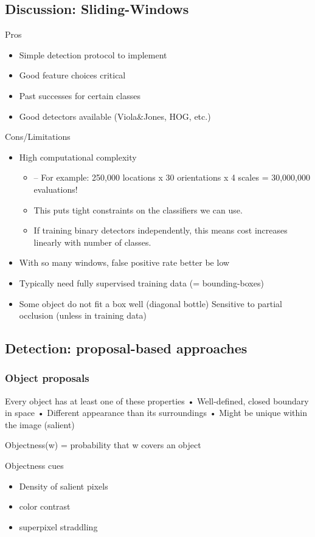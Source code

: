 \subsection{Discussion: Sliding-Windows }
Pros
\begin{itemize}
	\item Simple detection protocol to implement
	\item Good feature choices critical
	\item Past successes for certain classes
	\item Good detectors available (Viola\&Jones, HOG, etc.)
\end{itemize}
Cons/Limitations
\begin{itemize}
	\item High computational complexity 
	\begin{itemize}
		\item – For example: 250,000 locations x 30 orientations x 4 scales = 30,000,000 evaluations!
		\item This puts tight constraints on the classifiers we can use.
		\item If training binary detectors independently, this means cost increases linearly with number of classes.
	\end{itemize}
	\item With so many windows, false positive rate better be low
	\item Typically need fully supervised training data (= bounding-boxes)
	\item Some object do not fit a box well (diagonal bottle) Sensitive to partial occlusion (unless in training data)
\end{itemize}

\subsection{Detection: proposal-based approaches}
\subsubsection{Object proposals}
Every object has at least one of these properties
• Well-defined, closed boundary in space • Different appearance than its surroundings • Might be unique within the image (salient)

Objectness(w) = probability that w covers an object

Objectness cues
\begin{itemize}
	\item Density of salient pixels
	\item color contrast
	\item superpixel straddling
\end{itemize}
